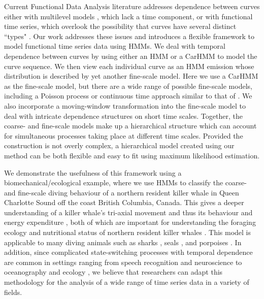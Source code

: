 

Current Functional Data Analysis literature addresses dependence between curves either with multilevel models \citep{Chen:2012,Di:2009}, which lack a time component, or with functional time series, which overlook the possibility that curves have several distinct ``types" \citep{Kokoszka:2018}. Our work addresses these issues and introduces a flexible framework to model functional time series data using HMMs.
We deal with temporal dependence between curves by using either an HMM or a CarHMM to model the curve sequence. We then view each individual curve as an HMM emission whose distribution is described by yet another fine-scale model. Here we use a CarHMM as the fine-scale model, but there are a wide range of possible fine-scale models, including a Poisson process or continuous time approach similar to that of \citet{Michelot:2019}. We also incorporate a moving-window transformation into the fine-scale model to deal with intricate dependence structures on short time scales. Together, the coarse- and fine-scale models make up a hierarchical structure which can account for simultaneous processes taking place at different time scales. Provided the construction is not overly complex, a hierarchical model created using our method can be both flexible and easy to fit using maximum likelihood estimation.

We demonstrate the usefulness of this framework using a biomechanical/ecological example, where we use HMMs to classify the coarse- and fine-scale diving behaviour of a northern resident killer whale in Queen Charlotte Sound off the coast British Columbia, Canada. This gives a deeper understanding of a killer whale's tri-axial movement and thus its behaviour and energy expenditure \citep{Gleiss:2011,Qasem:2012}, both of which are important for understanding the foraging ecology and nutritional status of northern resident killer whales \citep{Noren:2011}. This model is applicable to many diving animals such as sharks \citep{Adam:2019}, seals \citep{Dot:2016}, and porpoises \citep{Barajas:2017}. In addition, since complicated state-switching processes with temporal dependence are common in settings ranging from speech recognition \citep{Juang:1991} and neuroscience \citep{Langrock:2013} to oceanography \citep{Bulla:2012} and ecology \citep{Adam:2019}, we believe that researchers can adapt this methodology for the analysis of a wide range of time series data in a variety of fields.

